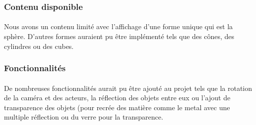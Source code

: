 \documentclass[12pt]{article}
\begin{document}
		\subsubsection{Contenu disponible}
		
	\paragraph{} Nous avons un contenu limité avec l'affichage d'une forme unique qui est la sphère. D'autres formes auraient pu être implémenté tels que des cônes, des cylindres ou des cubes.
	
		\subsubsection{Fonctionnalités}
	
	\paragraph{}De nombreuses fonctionnalités aurait pu être ajouté au projet tels que la rotation de la caméra et des acteurs, la réflection des objets entre eux ou l'ajout de transparence des objets (pour recrée des matière comme le metal avec une multiple réflection ou du verre pour la transparence.
			
\end{document}
